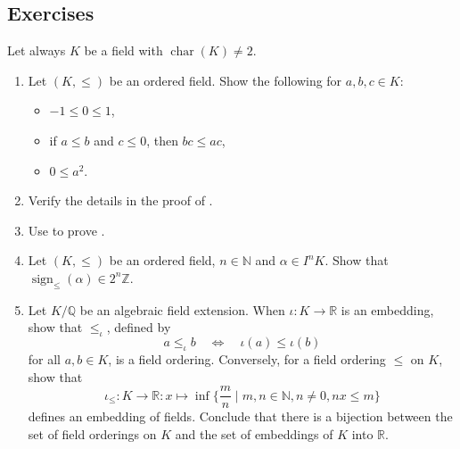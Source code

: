 \documentclass[12pt, leqno, british]{amsart}
\theoremstyle{definition}
\theoremstyle{plain}
\theoremstyle{remark}
\newcommand{\mbb}{\mathbb}
\newcommand{\nat}{\mbb N}
\newcommand{\rr}{\mathbb R}
\newcommand{\qq}{\mbb Q}
\newcommand{\zz}{\mbb Z}
\DeclareMathOperator{\charac}{char}
\DeclareMathOperator{\sign}{sign}
\begin{document}
\subsection{Exercises}
Let always $K$ be a field with $\charac(K) \neq 2$.
\begin{enumerate}
\item\label{ex:orderings-computations}
Let $(K, \leq)$ be an ordered field.
Show the following for $a, b, c \in K$:
\begin{itemize}
\item $-1 \leq 0 \leq 1$,
\item if $a \leq b$ and $c \leq 0$, then $bc \leq ac$,
\item $0 \leq a^2$.
\end{itemize}
\item Verify the details in the proof of .
\item Use  to prove .
\item Let $(K, \leq)$ be an ordered field, $n \in \nat$ and $\alpha \in I^n K$.
Show that $\sign_{\leq}(\alpha) \in 2^n\zz$.
\item Let $K/\qq$ be an algebraic field extension.
When $\iota : K \to \rr$ is an embedding, show that $\leq_\iota$, defined by
$$ a \leq_\iota b \quad\Leftrightarrow\quad \iota(a) \leq \iota(b)$$
for all $a, b \in K$, is a field ordering.
Conversely, for a field ordering $\leq$ on $K$, show that
$$ \iota_\leq : K \to \rr : x \mapsto \inf \lbrace \frac{m}{n} \mid m, n \in \nat, n \neq 0, nx \leq m \rbrace $$
defines an embedding of fields.
Conclude that there is a bijection between the set of field orderings on $K$ and the set of embeddings of $K$ into $\rr$. 
\end{enumerate}

\printindex
\printbibliography
\end{document}
